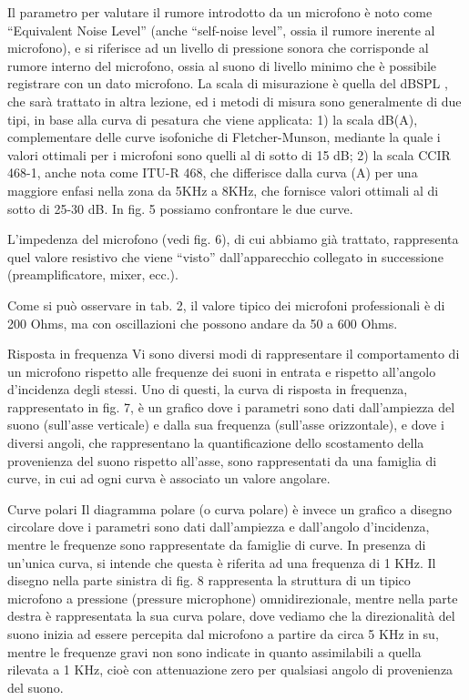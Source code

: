 Il parametro per valutare il rumore introdotto da un microfono è noto come “Equivalent Noise Level” (anche “self-noise level”, ossia il rumore inerente al microfono), e si riferisce ad un livello di pressione sonora che corrisponde al rumore interno del microfono, ossia al suono di livello minimo che è possibile registrare con un dato microfono. La scala di misurazione è quella del dBSPL , che sarà trattato in altra lezione, ed i metodi di misura sono generalmente di due tipi, in base alla curva di pesatura che viene applicata:
1) la scala dB(A), complementare delle curve isofoniche di Fletcher-Munson, mediante la quale i valori ottimali per i microfoni sono quelli al di sotto di 15 dB;
2) la scala CCIR 468-1, anche nota come ITU-R 468, che differisce dalla curva (A) per una maggiore enfasi nella zona da 5KHz a 8KHz, che fornisce valori ottimali al di sotto di 25-30 dB.
In fig. 5 possiamo confrontare le due curve.

L’impedenza del microfono (vedi fig. 6), di cui abbiamo già trattato, rappresenta quel valore resistivo che viene “visto” dall’apparecchio collegato in successione (preamplificatore, mixer, ecc.).

Come si può osservare in tab. 2, il valore tipico dei microfoni professionali è di 200 Ohms, ma con oscillazioni che possono andare da 50 a 600 Ohms.

Risposta in frequenza
Vi sono diversi modi di rappresentare il comportamento di un microfono rispetto alle frequenze dei suoni in entrata e rispetto all’angolo d’incidenza degli stessi. Uno di questi, la curva di risposta in frequenza, rappresentato in fig. 7, è un grafico dove i parametri sono dati dall’ampiezza del suono (sull’asse verticale) e dalla sua frequenza (sull’asse orizzontale), e dove i diversi angoli, che rappresentano la quantificazione dello scostamento della provenienza del suono rispetto all’asse, sono rappresentati da una famiglia di curve, in cui ad ogni curva è associato un valore angolare.

Curve polari
Il diagramma polare (o curva polare) è invece un grafico a disegno circolare dove i parametri sono dati dall’ampiezza e dall’angolo d’incidenza, mentre le frequenze sono rappresentate da famiglie di curve. In presenza di un’unica curva, si intende che questa è riferita ad una frequenza di 1 KHz.
Il disegno nella parte sinistra di fig. 8 rappresenta la struttura di un tipico microfono a pressione (pressure microphone) omnidirezionale, mentre nella parte destra è rappresentata la sua curva polare, dove vediamo che la direzionalità del suono inizia ad essere percepita dal microfono a partire da circa 5 KHz in su, mentre le frequenze gravi non sono indicate in quanto assimilabili a quella rilevata a 1 KHz, cioè con attenuazione zero per qualsiasi angolo di provenienza del suono.

